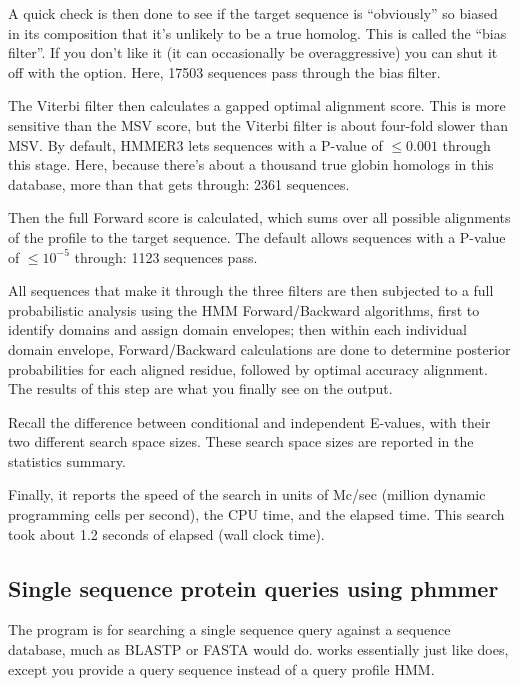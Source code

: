 A quick check is then done to see if the target sequence is
``obviously'' so biased in its composition that it's unlikely to be a
true homolog. This is called the ``bias filter''. If you don't like it
(it can occasionally be overaggressive) you can shut it off with the
 option. Here, 17503 sequences pass through the bias
filter.

The Viterbi filter then calculates a gapped optimal alignment score.
This is more sensitive than the MSV score, but the Viterbi filter is
about four-fold slower than MSV. By default, HMMER3 lets sequences
with a P-value of $\leq 0.001$ through this stage. Here, because
there's about a thousand true globin homologs in this database, more
than that gets through: 2361 sequences.

Then the full Forward score is calculated, which sums over all
possible alignments of the profile to the target sequence. The default
allows sequences with a P-value of $\leq 10^{-5}$ through: 1123
sequences pass.

All sequences that make it through the three filters are then
subjected to a full probabilistic analysis using the HMM
Forward/Backward algorithms, first to identify domains and assign
domain envelopes; then within each individual domain envelope,
Forward/Backward calculations are done to determine posterior
probabilities for each aligned residue, followed by optimal accuracy
alignment. The results of this step are what you finally see on the
output.

Recall the difference between conditional and independent E-values,
with their two different search space sizes. These search space sizes
are reported in the statistics summary.

Finally, it reports the speed of the search in units of Mc/sec
(million dynamic programming cells per second), the CPU time, and the
elapsed time. This search took about 1.2 seconds of elapsed (wall
clock time).



\subsection{Single sequence protein queries using phmmer}

The  program is for searching a single sequence query
against a sequence database, much as BLASTP or FASTA would
do.  works essentially just like  does,
except you provide a query sequence instead of a query profile HMM.

